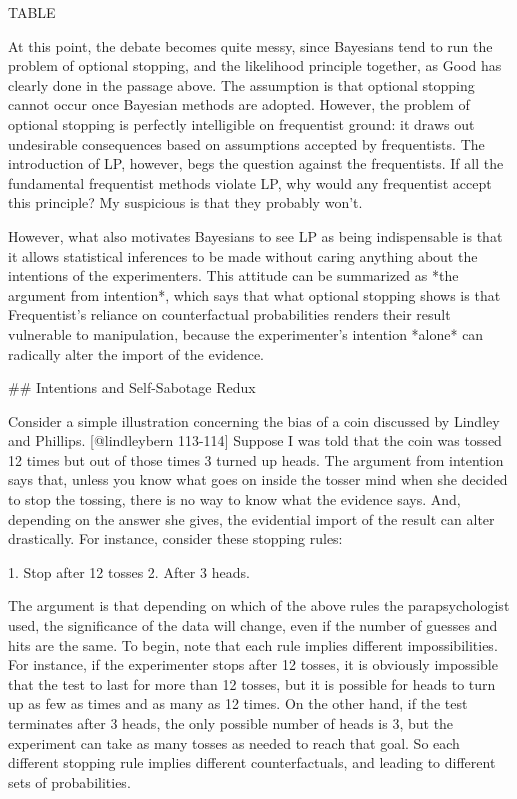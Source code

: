 TABLE

At this point, the debate becomes quite messy, since Bayesians tend to
run the problem of optional stopping, and the likelihood principle
together, as Good has clearly done in the passage above. The assumption
is that optional stopping cannot occur once Bayesian methods are
adopted. However, the problem of optional stopping is perfectly
intelligible on frequentist ground: it draws out undesirable
consequences based on assumptions accepted by frequentists. The
introduction of LP, however, begs the question against the frequentists.
If all the fundamental frequentist methods violate LP, why would any
frequentist accept this principle? My suspicious is that they probably
won't.

However, what also motivates Bayesians to see LP as being indispensable
is that it allows statistical inferences to be made without caring
anything about the intentions of the experimenters. This attitude can be
summarized as *the argument from intention*, which says that what
optional stopping shows is that Frequentist's reliance on counterfactual
probabilities renders their result vulnerable to manipulation, because
the experimenter's intention *alone* can radically alter the import of
the evidence.

\#\# Intentions and Self-Sabotage Redux

Consider a simple illustration concerning the bias of a coin discussed
by Lindley and Phillips. {[}@lindleybern 113-114{]} Suppose I was told
that the coin was tossed 12 times but out of those times 3 turned up
heads. The argument from intention says that, unless you know what goes
on inside the tosser mind when she decided to stop the tossing, there is
no way to know what the evidence says. And, depending on the answer she
gives, the evidential import of the result can alter drastically. For
instance, consider these stopping rules:

1. Stop after 12 tosses 2. After 3 heads.

The argument is that depending on which of the above rules the
parapsychologist used, the significance of the data will change, even if
the number of guesses and hits are the same. To begin, note that each
rule implies different impossibilities. For instance, if the
experimenter stops after 12 tosses, it is obviously impossible that the
test to last for more than 12 tosses, but it is possible for heads to
turn up as few as times and as many as 12 times. On the other hand, if
the test terminates after 3 heads, the only possible number of heads is
3, but the experiment can take as many tosses as needed to reach that
goal. So each different stopping rule implies different counterfactuals,
and leading to different sets of probabilities.

